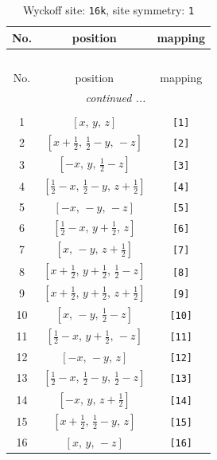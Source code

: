 \documentclass[fleqn,8pt]{jsarticle}
\begin{document}
\begin{longtable}{ccc}
\caption{Wyckoff site: {\tt 16k}, site symmetry: {\tt 1}}
 \\
 \hline \hline
No. & position & mapping \\ \hline \endfirsthead

\multicolumn{2}{l}{\tablename\ \thetable{}} \\
 \hline \hline
No. & position & mapping \\ \hline \endhead

 \hline \hline
\multicolumn{2}{r}{\footnotesize\it continued ...} \\ \endfoot

 \hline \hline
\multicolumn{2}{r}{} \\ \endlastfoot

1 & $\left[ x,\, y,\, z \right]$ & {\tt [1]} \\ \hline
2 & $\left[ x + \frac{1}{2},\, \frac{1}{2} - y,\, - z \right]$ & {\tt [2]} \\ \hline
3 & $\left[ - x,\, y,\, \frac{1}{2} - z \right]$ & {\tt [3]} \\ \hline
4 & $\left[ \frac{1}{2} - x,\, \frac{1}{2} - y,\, z + \frac{1}{2} \right]$ & {\tt [4]} \\ \hline
5 & $\left[ - x,\, - y,\, - z \right]$ & {\tt [5]} \\ \hline
6 & $\left[ \frac{1}{2} - x,\, y + \frac{1}{2},\, z \right]$ & {\tt [6]} \\ \hline
7 & $\left[ x,\, - y,\, z + \frac{1}{2} \right]$ & {\tt [7]} \\ \hline
8 & $\left[ x + \frac{1}{2},\, y + \frac{1}{2},\, \frac{1}{2} - z \right]$ & {\tt [8]} \\ \hline
9 & $\left[ x + \frac{1}{2},\, y + \frac{1}{2},\, z + \frac{1}{2} \right]$ & {\tt [9]} \\ \hline
10 & $\left[ x,\, - y,\, \frac{1}{2} - z \right]$ & {\tt [10]} \\ \hline
11 & $\left[ \frac{1}{2} - x,\, y + \frac{1}{2},\, - z \right]$ & {\tt [11]} \\ \hline
12 & $\left[ - x,\, - y,\, z \right]$ & {\tt [12]} \\ \hline
13 & $\left[ \frac{1}{2} - x,\, \frac{1}{2} - y,\, \frac{1}{2} - z \right]$ & {\tt [13]} \\ \hline
14 & $\left[ - x,\, y,\, z + \frac{1}{2} \right]$ & {\tt [14]} \\ \hline
15 & $\left[ x + \frac{1}{2},\, \frac{1}{2} - y,\, z \right]$ & {\tt [15]} \\ \hline
16 & $\left[ x,\, y,\, - z \right]$ & {\tt [16]} \\
\end{longtable}
\end{document}
